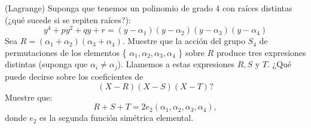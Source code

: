 

(Lagrange) Suponga que tenemos un polinomio de grado 4 con
raíces distintas (¿qué sucede si se repiten raíces?):
\[
y^4 + py^2 + qy + r = (y - \alpha_1)(y - \alpha_2)(y - \alpha_3)(y - \alpha_4)
\]
Sea \( R = (\alpha_1 + \alpha_2)(\alpha_3 + \alpha_4) \). Muestre que la acción del grupo \( S_4 \) de
permutaciones de los elementos \{ \(\alpha_1, \alpha_2, \alpha_3, \alpha_4\) \} sobre \( R \) produce
tres expresiones distintas (suponga que \( \alpha_i \neq \alpha_j \)). Llamemos a estas expresiones \( R, S \) y \( T \).
¿Qué puede decirse sobre los coeficientes de
\[
(X - R)(X - S)(X - T)?
\]
Muestre que:
\[
R+S+T = 2e_2(\alpha_1, \alpha_2, \alpha_3, \alpha_4),
\]
donde \( e_2 \) es la segunda función simétrica elemental.
